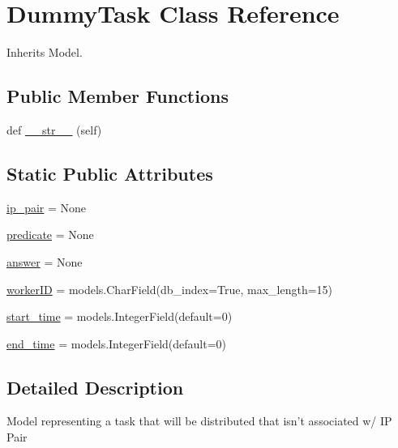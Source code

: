 \hypertarget{classdynamicfilterapp_1_1models_1_1_dummy_task}{}\section{Dummy\+Task Class Reference}
\label{classdynamicfilterapp_1_1models_1_1_dummy_task}


Inherits Model.

\subsection*{Public Member Functions}
\begin{DoxyCompactItemize}
\item 
def \hyperlink{classdynamicfilterapp_1_1models_1_1_dummy_task_a23e8041ce1015febe4fdace3225714f9}{\+\_\+\+\_\+str\+\_\+\+\_\+} (self)
\end{DoxyCompactItemize}
\subsection*{Static Public Attributes}
\begin{DoxyCompactItemize}
\item 
\hyperlink{classdynamicfilterapp_1_1models_1_1_dummy_task_a6a81c84f60e4fc0f40d6812d6f6452c7}{ip\+\_\+pair} = None
\item 
\hyperlink{classdynamicfilterapp_1_1models_1_1_dummy_task_a59edc4e3874fffd0c2a9ef88cddfc0fa}{predicate} = None
\item 
\hyperlink{classdynamicfilterapp_1_1models_1_1_dummy_task_a8c4d9ee8d4f82d724070b97e70b9c4e5}{answer} = None
\item 
\hyperlink{classdynamicfilterapp_1_1models_1_1_dummy_task_ab569d6674e112f916cbe81a2304d418f}{worker\+ID} = models.\+Char\+Field(db\+\_\+index=True, max\+\_\+length=15)
\item 
\hyperlink{classdynamicfilterapp_1_1models_1_1_dummy_task_a2530c3908f0179486a4c2255f792e27a}{start\+\_\+time} = models.\+Integer\+Field(default=0)
\item 
\hyperlink{classdynamicfilterapp_1_1models_1_1_dummy_task_aa18736cc12f8beb112bd108c5a09ef8d}{end\+\_\+time} = models.\+Integer\+Field(default=0)
\end{DoxyCompactItemize}


\subsection{Detailed Description}
\begin{DoxyVerb}Model representing a task that will be distributed that isn't associated w/ IP Pair
\end{DoxyVerb}
 

